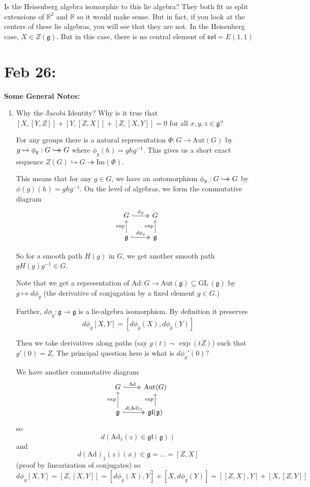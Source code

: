 \documentclass[12pt]{article}
\newcommand{\R}{\mathbb{R}}
\newcommand{\GL}{\text{GL}\,}
\newcommand{\biject}{\hookrightarrow \hspace{-8pt} \rightarrow}
\newcommand{\g}{\mathfrak{g}}
\newcommand{\glf}{\mathfrak{gl}}
\begin{document}
    Is the Heisenberg algebra isomorphic to this lie algebra? They both fit as split extensions of $\R^2$ and $\R$ so it would make sense. But in fact, if you look at the centers of these lie algebras, you will see that they are not. In the Heisenberg case, $X \in Z(\g)$. But in this case, there is no central element of $\mathfrak{sol} = E(1, 1)$ 
   
\section{Feb 26:}
    \textbf{Some General Notes:}
    \begin{enumerate}
        \item Why the Jacobi Identity? Why is it true that $[X, [Y, Z]] + [Y, [Z, X]] + [Z, [X, Y]] = 0$ for all $x, y, z \in \g$? 
        
        For any groups there is a natural representation $\Phi: G \to \text{Aut}(G)$ by $g \mapsto \phi_g: G \biject G$ where $\phi_g(h) = ghg^{-1}$. This gives us a short exact sequence $Z(G) \hookrightarrow G \twoheadrightarrow \text{Im}(\Phi)$. 

        This means that for any $g \in G$, we have an automorphism $\phi_g: G \biject G$ by $\phi(g)(h) = ghg^{-1}$. On the level of algebras, we form the commutative diagram 
        \[\begin{tikzcd}
            G \arrow[hook, two heads]{r}{\phi_g} & G\\
            \g \arrow{u}{\exp} \arrow[hook, two heads]{r}{d\phi_g} & \g \arrow{u}{\exp}
        \end{tikzcd}\]

        So for a smooth path $H(g)$ in $G$, we get another smooth path $gH(g)g^{-1} \in G$. 

        Note that we get a representation of $\text{Ad}: G \to \text{Aut}(\g) \subseteq \GL(\g)$ by $g \mapsto d\phi_g$ (the derivative of conjugation by a fixed element $g \in G$.)

        Further, $d\phi_g: \g \to \g$ is a lie-algebra isomorphism. By definition it preserves 
        \[d\phi_g[X, Y] = [d\phi_g(X), d\phi_g(Y)]\]

        Then we take derivatives along paths (say $g(t) \sim \exp(tZ)$) such that $g'(0) = Z$. The principal question here is what is $d\phi_g'(0)$? 

        We have another commutative diagram
        \[\begin{tikzcd}
            G \arrow[hook, two heads]{r}{\text{Ad}} & \text{Aut}(G)\\
            \g \arrow{u}{\exp} \arrow[hook, two heads]{r}{d(\text{Ad})_1} & \glf(\g) \arrow{u}{\exp}
        \end{tikzcd}\]
        so 
        \[d(\text{Ad}_1(z) \in \glf(\g))\] 
        and 
        \[d(\text{Ad})_1(z)(x) \in \g = \dots = [Z, X]\]
        (proof by linearization of conjugates) so 
        \[d\phi_g[X, Y] = [Z, [X, Y]] = [d\phi_g(X), Y] + [X, d\phi_g(Y)] = [[Z, X], Y] + [X, [Z, Y]]\]


\end{enumerate}
\end{document}
